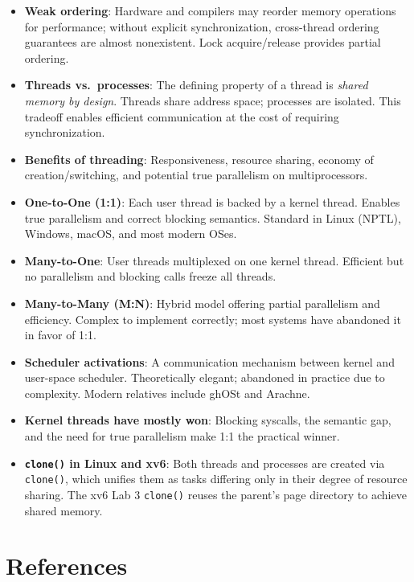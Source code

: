\documentclass[11pt]{article}
\begin{document}
\begin{itemize}
    \item \textbf{Weak ordering}: Hardware and compilers may reorder memory operations for performance; without explicit synchronization, cross-thread ordering guarantees are almost nonexistent. Lock acquire/release provides partial ordering.
    \item \textbf{Threads vs.\ processes}: The defining property of a thread is \emph{shared memory by design}. Threads share address space; processes are isolated. This tradeoff enables efficient communication at the cost of requiring synchronization.
    \item \textbf{Benefits of threading}: Responsiveness, resource sharing, economy of creation/switching, and potential true parallelism on multiprocessors.
    \item \textbf{One-to-One (1:1)}: Each user thread is backed by a kernel thread. Enables true parallelism and correct blocking semantics. Standard in Linux (NPTL), Windows, macOS, and most modern OSes.
    \item \textbf{Many-to-One}: User threads multiplexed on one kernel thread. Efficient but no parallelism and blocking calls freeze all threads.
    \item \textbf{Many-to-Many (M:N)}: Hybrid model offering partial parallelism and efficiency. Complex to implement correctly; most systems have abandoned it in favor of 1:1.
    \item \textbf{Scheduler activations}: A communication mechanism between kernel and user-space scheduler. Theoretically elegant; abandoned in practice due to complexity. Modern relatives include ghOSt and Arachne.
    \item \textbf{Kernel threads have mostly won}: Blocking syscalls, the semantic gap, and the need for true parallelism make 1:1 the practical winner.
    \item \textbf{\texttt{clone()} in Linux and xv6}: Both threads and processes are created via \texttt{clone()}, which unifies them as tasks differing only in their degree of resource sharing. The xv6 Lab 3 \texttt{clone()} reuses the parent's page directory to achieve shared memory.
\end{itemize}

\section{References}
\end{document}
